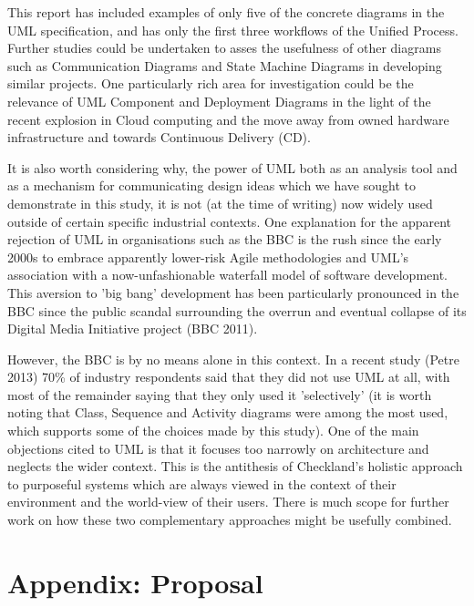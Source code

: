 \documentclass{article}
\begin{document}

This report has included examples of only five of the concrete diagrams in the UML specification, and has only the first three workflows of the Unified Process. Further studies could be undertaken to asses the usefulness of other diagrams such as Communication Diagrams and State Machine Diagrams in developing similar projects. One particularly rich area for investigation could be the relevance of UML Component and Deployment Diagrams in the light of the recent explosion in Cloud computing and the move away from owned hardware infrastructure and towards Continuous Delivery (CD).

It is also worth considering why, the power of UML both as an analysis tool and as a mechanism for communicating design ideas which we have sought to demonstrate in this study, it is not (at the time of writing) now widely used outside of certain specific industrial contexts. One explanation for the apparent rejection of UML in organisations such as the BBC is the rush since the early 2000s to embrace apparently lower-risk Agile methodologies and UML's association with a now-unfashionable waterfall model of software development. This aversion to 'big bang' development has been particularly pronounced in the BBC since the public scandal surrounding the overrun and eventual collapse of its Digital Media Initiative project (BBC 2011).

However, the BBC is by no means alone in this context. In a recent study (Petre 2013) 70\% of industry respondents said that they did not use UML at all, with most of the remainder saying that they only used it 'selectively' (it is worth noting that Class, Sequence and Activity diagrams were among the most used, which supports some of the choices made by this study). One of the main objections cited to UML is that it focuses too narrowly on architecture and neglects the wider context. This is the antithesis of Checkland's holistic approach to purposeful systems which are always viewed in the context of their environment and the world-view of their users. There is much scope for further work on how these two complementary approaches might be usefully combined.


\clearpage

\section{Appendix: Proposal}
\end{document}

